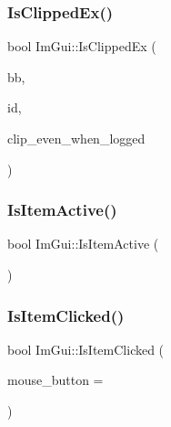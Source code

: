 \hypertarget{namespace_im_gui_a8674467ae34d04bc99df1f7f98f47407}{}\label{namespace_im_gui_a8674467ae34d04bc99df1f7f98f47407} 
\subsubsection{\texorpdfstring{Is\+Clipped\+Ex()}{IsClippedEx()}}
{\footnotesize\ttfamily bool Im\+Gui\+::\+Is\+Clipped\+Ex (\begin{DoxyParamCaption}\item[{const \hyperlink{struct_im_rect}{Im\+Rect} \&}]{bb,  }\item[{Im\+Gui\+ID}]{id,  }\item[{bool}]{clip\+\_\+even\+\_\+when\+\_\+logged }\end{DoxyParamCaption})}

\hypertarget{namespace_im_gui_a2d8ac4569456a8003e4dddd39caf771c}{}\label{namespace_im_gui_a2d8ac4569456a8003e4dddd39caf771c} 
\subsubsection{\texorpdfstring{Is\+Item\+Active()}{IsItemActive()}}
{\footnotesize\ttfamily bool Im\+Gui\+::\+Is\+Item\+Active (\begin{DoxyParamCaption}{ }\end{DoxyParamCaption})}

\hypertarget{namespace_im_gui_a0b5780dbd580e28f5d31f39da80b0b01}{}\label{namespace_im_gui_a0b5780dbd580e28f5d31f39da80b0b01} 
\subsubsection{\texorpdfstring{Is\+Item\+Clicked()}{IsItemClicked()}}
{\footnotesize\ttfamily bool Im\+Gui\+::\+Is\+Item\+Clicked (\begin{DoxyParamCaption}\item[{int}]{mouse\+\_\+button = {} }\end{DoxyParamCaption})}

\hypertarget{namespace_im_gui_ac9a400eff3a9561d95e80486c52a660b}{}\label{namespace_im_gui_ac9a400eff3a9561d95e80486c52a660b} 
